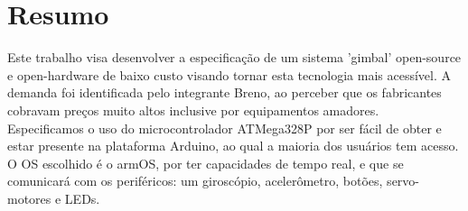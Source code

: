 \chapter*{Resumo}

\noindent Este trabalho visa desenvolver a especificação de um sistema 'gimbal' open-source e open-hardware de baixo custo visando tornar esta tecnologia mais acessível. A demanda foi identificada pelo integrante Breno, ao perceber que os fabricantes cobravam preços muito altos inclusive por equipamentos amadores. \\
Especificamos o uso do microcontrolador ATMega328P por ser fácil de obter e estar presente na plataforma Arduino, ao qual a maioria dos usuários tem acesso. O OS escolhido é o armOS, por ter capacidades de tempo real, e que se comunicará com os periféricos: um giroscópio, acelerômetro, botões, servo-motores e LEDs.